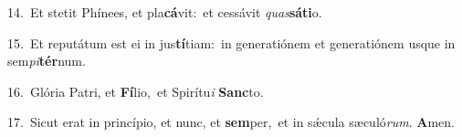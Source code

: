 {\numbfont\textcolor{\numbcolor}{14.}}~Et stetit Phínees, et pla\-\textbf{cá}\-vit:~\star et cessávit \textit{quas}\-\textbf{sá}\textbf{ti}o.\par
{\numbfont\textcolor{\numbcolor}{15.}}~Et reputátum est ei in jus\-\textbf{tí}\-tiam:~\star in generatiónem et generatiónem usque in sem\-\textit{pi}\-\textbf{tér}num.\par
{\numbfont\textcolor{\numbcolor}{16.}}~Glória Patri, et \textbf{Fí}\-lio,~\star et Spirítu\textit{i} \textbf{Sanc}\-to.\par
{\numbfont\textcolor{\numbcolor}{17.}}~Sicut erat in princípio, et nunc, et \textbf{sem}\-per,~\star et in sǽcula sæculó\-\textit{rum}\-. \textbf{A}\-men.\par
